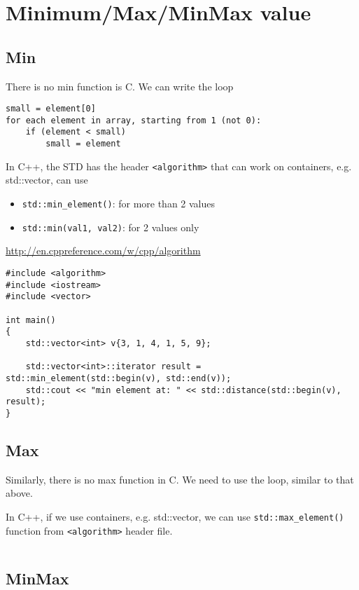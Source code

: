 \section{Minimum/Max/MinMax value}

\subsection{Min}

There is no min function is C. We can write the loop
\begin{verbatim}
small = element[0]
for each element in array, starting from 1 (not 0):
    if (element < small)
        small = element
\end{verbatim}

In C++, the STD has the header \verb!<algorithm>! that can work on containers,
e.g. std::vector, can use 
\begin{itemize}
  \item \verb!std::min_element()!: for more than 2 values
  \item \verb!std::min(val1, val2)!: for 2 values only
\end{itemize}
\url{http://en.cppreference.com/w/cpp/algorithm}

\begin{Verbatim}
#include <algorithm>
#include <iostream>
#include <vector>
 
int main()
{
    std::vector<int> v{3, 1, 4, 1, 5, 9};
 
    std::vector<int>::iterator result = std::min_element(std::begin(v), std::end(v));
    std::cout << "min element at: " << std::distance(std::begin(v), result);
}
\end{Verbatim}

\subsection{Max}

Similarly, there is no max function in C. We need to use the loop, similar to
that above.


In C++, if we use containers, e.g. std::vector, we can use
\verb!std::max_element()! function from \verb!<algorithm>! header file.
\begin{Verbatim}

\end{Verbatim}


\subsection{MinMax}

